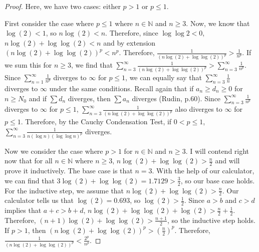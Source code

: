 \documentclass[11pt]{article}
\begin{document}
\begin{proof}
        Here, we have two cases: either $p > 1$ or $p \leq 1$.

        First consider the case where $p \leq 1$ where $n \in \mathbb{N}$ and $n \geq 3$.
        Now, we know that $\log(2) < 1$, so $n\log(2) < n$.
        Therefore, since $\log\log 2 < 0$, $n\log(2) + \log \log (2) < n$ and by extension $(n\log(2) + \log \log (2))^p < n^p$.
        Therefore, $\frac{1}{(n\log(2) + \log \log (2))^p} > \frac{1}{n^p}$.
        If we sum this for $n \geq 3$, we find that $\sum_{n=3}^{\infty} \frac{1}{(n\log(2) + \log \log (2))^p} > \sum_{n=3}^{\infty} \frac{1}{n^p}$.
        Since $\sum_{n=1}^{\infty} \frac{1}{n^p}$ diverges to $\infty$ for $p \leq 1$, we can equally say that $\sum_{n=3}^{\infty} \frac{1}{n}$ diverges to $\infty$ under the same conditions.
        Recall again that if $a_n \geq d_n \geq 0$ for $n \geq N_0$ and if $\sum d_n$ diverges, then $\sum a_n$ diverges (Rudin, p.60).
        Since $\sum_{n=3}^{\infty} \frac{1}{n^p}$ diverges to $\infty$ for $p \leq 1$, $\sum_{n=3}^{\infty} \frac{1}{(n\log(2) + \log \log (2))^p}$ also diverges to $\infty$ for $p \leq 1$.
        Therefore, by the Cauchy Condensation Test, if $0 < p \leq 1$, $\sum_{n = 3}^{\infty} \frac{1}{n(\log n)(\log \log n)^p}$ diverges.

        Now we consider the case where $p > 1$ for $n \in \mathbb{N}$ and $n \geq 3$.
        I will contend right now that for all $n \in \mathbb{N}$ where $n \geq 3$, $n\log(2) + \log \log (2) > \frac{n}{2}$ and will prove it inductively.
        The base case is that $n = 3$.
        With the help of our calculator, we can find that $3\log(2) + \log \log (2) = 1.7129 > \frac{3}{2}$, so our base case holds.
        For the inductive step, we assume that $n\log(2) + \log \log (2) > \frac{n}{2}$.
        Our calculator tells us that $\log(2) = 0.693$, so $\log(2) > \frac{1}{2}$.
        Since $a > b$ and $c > d$ implies that $a + c > b + d$, $n\log(2) + \log \log (2) + \log(2) > \frac{n}{2} + \frac{1}{2}$.
        Therefore, $(n + 1)\log(2) + \log \log (2) > \frac{n + 1}{2}$, so the inductive step holds.
        If $p > 1$, then $\left( n\log(2) + \log \log (2) \right)^p > \left( \frac{n}{2} \right)^p$.
        Therefore, $\frac{1}{\left( n\log(2) + \log \log (2) \right)^p} < \frac{2^p}{n^p}$.


\end{proof}
\end{document}
